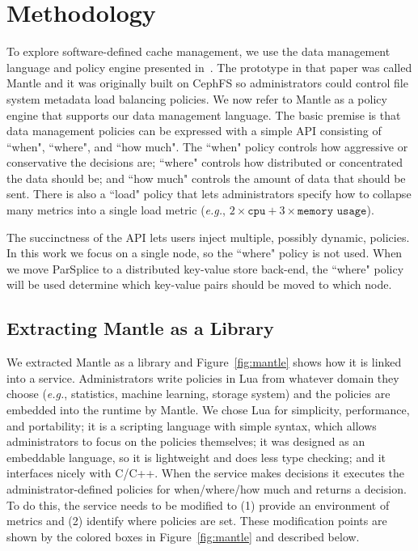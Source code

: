 \section{Methodology}

To explore software-defined cache management, we use the data management
language and policy engine presented in~\cite{sevilla:sc15-mantle}. The
prototype in that paper was called Mantle and it was originally built on CephFS
so administrators could control file system metadata load balancing policies.
We now refer to Mantle as a policy engine that supports our data management
language.  The basic premise is that data management policies can be expressed
with a simple API consisting of ``when", ``where", and ``how much". The ``when" policy
controls how aggressive or conservative the decisions are; ``where" controls
how distributed or concentrated the data should be; and ``how much" controls
the amount of data that should be sent. There is also a ``load" policy that
lets administrators specify how to collapse many metrics into a single load
metric ({\it e.g.}, \(2\times\texttt{cpu} + 3\times\texttt{memory usage}\)).

The succinctness of the API lets users inject multiple, possibly dynamic, policies. In
this work we focus on a single node, so the ``where" policy is not used. When
we move ParSplice to a distributed key-value store back-end, the ``where" policy
will be used determine which key-value pairs should be moved to which node.

\subsection{Extracting Mantle as a Library}
\label{sec:extracting}


We extracted Mantle as a library and Figure~\ref{fig:mantle} shows how it is
linked into a service.  Administrators write policies in Lua from whatever
domain they choose ({\it e.g.}, statistics, machine learning, storage system)
and the policies are embedded into the runtime by Mantle.  We chose Lua for
simplicity, performance, and portability; it is a scripting language with
simple syntax, which allows administrators to focus on the policies themselves;
it was designed as an embeddable language, so it is lightweight and does less
type checking; and it interfaces nicely with C/C++.  When the service makes
decisions it executes the administrator-defined policies for when/where/how
much and returns a decision.  To do this, the service needs to be modified to
(1) provide an environment of metrics and (2) identify where policies are set.
These modification points are shown by the colored boxes in
Figure~\ref{fig:mantle} and described below.

